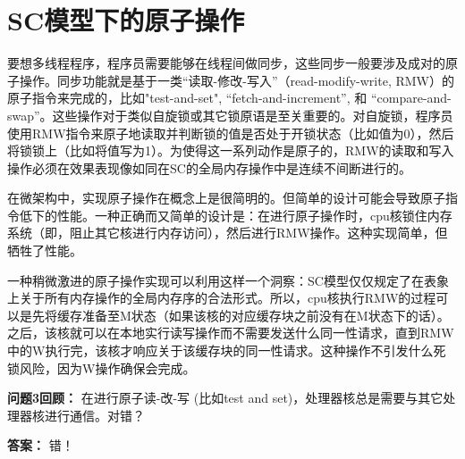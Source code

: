 \documentclass[UTF-8]{ctexrep}
\begin{document}
\section{SC模型下的原子操作}
\par 要想多线程程序，程序员需要能够在线程间做同步，这些同步一般要涉及成对的原子操作。同步功能就是基于一类“读取-修改-写入”（read-modify-write, RMW）的原子指令来完成的，比如"test-and-set", “fetch-and-increment”, 和 “compare-and-swap”。这些操作对于类似自旋锁或其它锁原语是至关重要的。对自旋锁，程序员使用RMW指令来原子地读取并判断锁的值是否处于开锁状态（比如值为0），然后将锁锁上（比如将值写为1）。为使得这一系列动作是原子的，RMW的读取和写入操作必须在效果表现像如同在SC的全局内存操作中是连续不间断进行的。
\par 在微架构中，实现原子操作在概念上是很简明的。但简单的设计可能会导致原子指令低下的性能。一种正确而又简单的设计是：在进行原子操作时，cpu核锁住内存系统（即，阻止其它核进行内存访问），然后进行RMW操作。这种实现简单，但牺牲了性能。
\par 一种稍微激进的原子操作实现可以利用这样一个洞察：SC模型仅仅规定了在表象上关于所有内存操作的全局内存序的合法形式。所以，cpu核执行RMW的过程可以是先将缓存准备至M状态（如果该核的对应缓存块之前没有在M状态下的话）。之后，该核就可以在本地实行读写操作而不需要发送什么同一性请求，直到RMW中的W执行完，该核才响应关于该缓存块的同一性请求。这种操作不引发什么死锁风险，因为W操作确保会完成。
\begin{sidebarbox}
\par \textbf {问题3回顾：}  在进行原子读-改-写 (比如test and set)，处理器核总是需要与其它处理器核进行通信。对错？
\par \textbf{答案：} 错！
\end{sidebarbox}










\par















 
\end{document}
